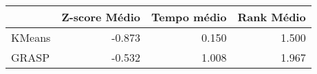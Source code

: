 \begin{table}
\centering
\label{tab:teste_melhor_metodo}
\begin{tabular}{lrrr}
\toprule
{} &  Z-score Médio &  Tempo médio &  Rank Médio \\
\midrule
KMeans &         -0.873 &        0.150 &       1.500 \\
GRASP  &         -0.532 &        1.008 &       1.967 \\
\bottomrule
\end{tabular}
\end{table}
